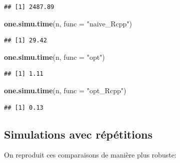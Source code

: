 \documentclass[
]{article}
\newenvironment{Shaded}{\begin{snugshade}}{\end{snugshade}}
\newcommand{\AttributeTok}[1]{\textcolor[rgb]{0.13,0.29,0.53}{#1}}
\newcommand{\FunctionTok}[1]{\textcolor[rgb]{0.13,0.29,0.53}{\textbf{#1}}}
\newcommand{\NormalTok}[1]{#1}
\newcommand{\StringTok}[1]{\textcolor[rgb]{0.31,0.60,0.02}{#1}}
\begin{document}
\begin{verbatim}
## [1] 2487.89
\end{verbatim}

\begin{Shaded}
\begin{Highlighting}[]
\FunctionTok{one.simu.time}\NormalTok{(n, }\AttributeTok{func =} \StringTok{"naive\_Rcpp"}\NormalTok{)}
\end{Highlighting}
\end{Shaded}

\begin{verbatim}
## [1] 29.42
\end{verbatim}

\begin{Shaded}
\begin{Highlighting}[]
\FunctionTok{one.simu.time}\NormalTok{(n, }\AttributeTok{func =} \StringTok{"opt"}\NormalTok{)}
\end{Highlighting}
\end{Shaded}

\begin{verbatim}
## [1] 1.11
\end{verbatim}

\begin{Shaded}
\begin{Highlighting}[]
\FunctionTok{one.simu.time}\NormalTok{(n, }\AttributeTok{func =} \StringTok{"opt\_Rcpp"}\NormalTok{)}
\end{Highlighting}
\end{Shaded}

\begin{verbatim}
## [1] 0.13
\end{verbatim}

\subsection{Simulations avec
répétitions}\label{simulations-avec-ruxe9puxe9titions}

On reproduit ces comparaisons de manière plus robuste:
\end{document}
